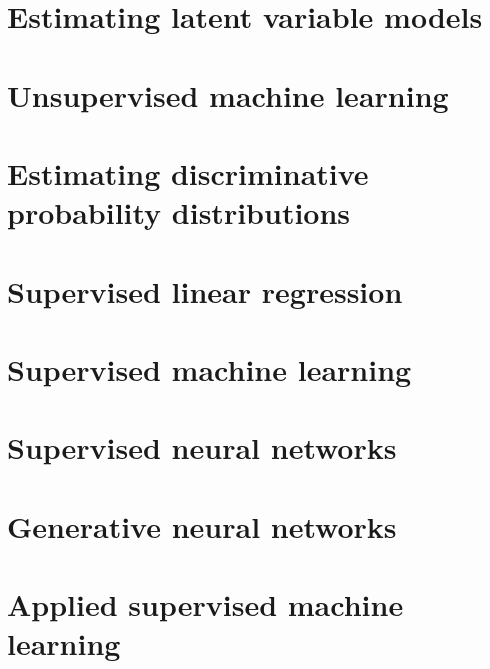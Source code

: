 \documentclass[oneside]{book}
\begin{document}
\part{Estimating latent variable models}


\part{Unsupervised machine learning}



\part{Estimating discriminative probability distributions}





\part{Supervised linear regression}





\part{Supervised machine learning}









\part{Supervised neural networks}




\part{Generative neural networks}





\part{Applied supervised machine learning}




\end{document}
